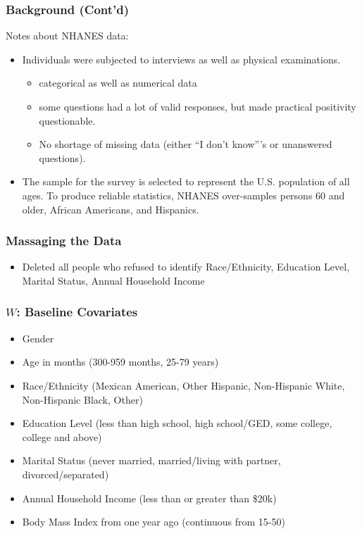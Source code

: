 \documentclass{beamer}
\begin{document}
\begin{frame}
  \frametitle{Background (Cont'd)}
  Notes about NHANES data:
  \begin{itemize}
 \item Individuals were subjected to interviews as well as physical examinations.
  \begin{itemize}
    \item categorical as well as numerical data
    \item some questions had a lot of valid responses, but made practical positivity questionable.
    \item No shortage of missing data (either ``I don't know'''s or unanswered questions).
  \end{itemize}
 \item The sample for the survey is selected to represent the U.S. population of all ages. To produce reliable statistics, NHANES over-samples persons 60 and older, African Americans, and Hispanics.
 \end{itemize}
\end{frame}

\begin{frame}
\frametitle{Massaging the Data}
  \begin{itemize}
    \vfill \item Deleted all people who refused to identify Race/Ethnicity, Education Level, Marital Status, Annual Household Income
  \end{itemize}
\end{frame}

\begin{frame}
\frametitle{$W$: Baseline Covariates}
   \begin{itemize}
   \item Gender
   \item Age in months (300-959 months, 25-79 years)
   \item Race/Ethnicity (Mexican American, Other Hispanic, Non-Hispanic White, Non-Hispanic Black, Other)
   \item Education Level (less than high school, high school/GED, some college, college and above)
   \item Marital Status (never married, married/living with partner, divorced/separated)
   \item Annual Household Income (less than or greater than \$20k)
   \item Body Mass Index from one year ago (continuous from 15-50)
  \end{itemize}
\end{frame}
\end{document}
